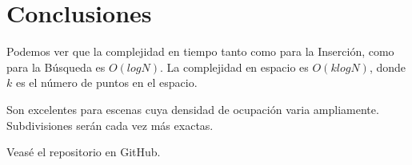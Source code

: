 \section{Conclusiones}
Podemos ver que la complejidad en tiempo tanto como para  la Inserción, como para la Búsqueda es  \(O(logN)\).
La complejidad en espacio es \(O(klogN)\), donde $k$ es el número de puntos en el espacio.

Son excelentes para escenas cuya densidad de ocupación varia ampliamente. Subdivisiones serán cada vez más exactas.

Veasé el repositorio en GitHub.\cite{repo}
